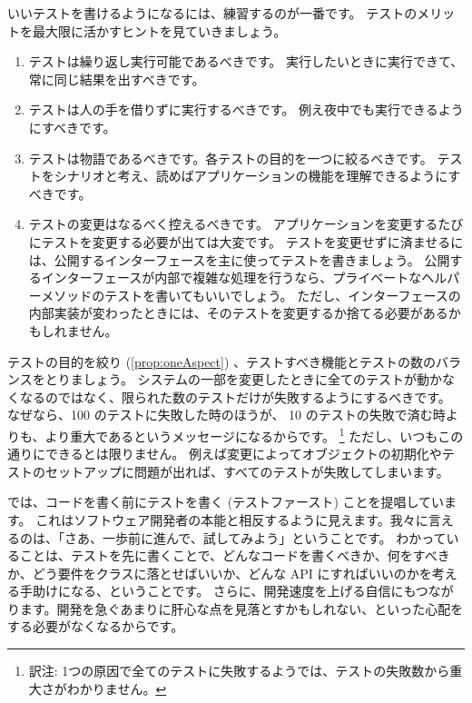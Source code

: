 \documentclass[a4paper,10pt,twoside]{book}
\begin{document}
いいテストを書けるようになるには、練習するのが一番です。
テストのメリットを最大限に活かすヒントを見ていきましょう。

\begin{enumerate}
\item テストは繰り返し実行可能であるべきです。
  実行したいときに実行できて、常に同じ結果を出すべきです。

\item テストは人の手を借りずに実行するべきです。
  例え夜中でも実行できるようにすべきです。

\item テストは物語であるべきです。各テストの目的を一つに絞るべきです。
  テストをシナリオと考え、読めばアプリケーションの機能を理解できるようにすべきです。 \label{prop:oneAspect}

\item テストの変更はなるべく控えるべきです。
  アプリケーションを変更するたびにテストを変更する必要が出ては大変です。
  テストを変更せずに済ませるには、公開するインターフェースを主に使ってテストを書きましょう。
  公開するインターフェースが内部で複雑な処理を行うなら、プライベートなヘルパーメソッドのテストを書いてもいいでしょう。
  ただし、インターフェースの内部実装が変わったときには、そのテストを変更するか捨てる必要があるかもしれません。

\end{enumerate}

テストの目的を絞り (\ref{prop:oneAspect}) 、テストすべき機能とテストの数のバランスをとりましょう。
システムの一部を変更したときに全てのテストが動かなくなるのではなく、限られた数のテストだけが失敗するようにするべきです。
なぜなら、100 のテストに失敗した時のほうが、 10 のテストの失敗で済む時よりも、より重大であるというメッセージになるからです。 \footnote{訳注: 1つの原因で全てのテストに失敗するようでは、テストの失敗数から重大さがわかりません。}
ただし、いつもこの通りにできるとは限りません。
例えば変更によってオブジェクトの初期化やテストのセットアップに問題が出れば、すべてのテストが失敗してしまいます。

 では、コードを書く前にテストを書く (テストファースト) ことを提唱しています。
これはソフトウェア開発者の本能と相反するように見えます。我々に言えるのは、「さあ、一歩前に進んで、試してみよう」ということです。 
わかっていることは、テストを先に書くことで、どんなコードを書くべきか、何をすべきか、どう要件をクラスに落とせばいいか、どんな API にすればいいのかを考える手助けになる、ということです。
さらに、開発速度を上げる自信にもつながります。開発を急ぐあまりに肝心な点を見落とすかもしれない、といった心配をする必要がなくなるからです。
\end{document}
